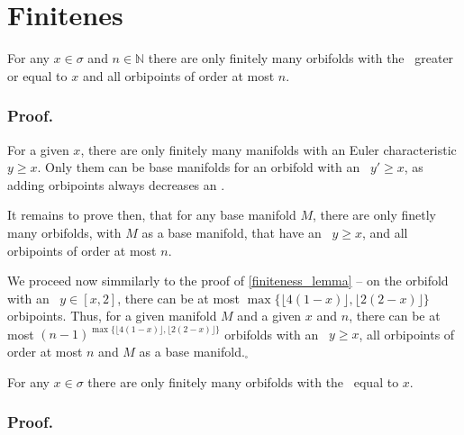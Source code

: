 \section{Finitenes}\label{finiteness}


\begin{observation}\label{first_finiteness_theorem}
For any $x \in \sigma$ and $n \in \mathbb{N}$ there are only finitely many orbifolds 
with the \Eoc\ greater or equal to $x$ and all orbipoints of order at most $n$.
\end{observation}
\subsubsection{Proof.} 

For a given $x$, there are only finitely many manifolds 
with an Euler characteristic $y \geq x$. Only them can be 
base manifolds for an orbifold with an \Eoc\ $y'\geq x$, as adding orbipoints always 
decreases an \Eoc. 

It remains to prove then, that for any base manifold $M$, there are only finetly many orbifolds, 
with $M$ as a base manifold, that have 
 an \Eoc\ $y \geq x$, and all orbipoints of order at most $n$.

We proceed now simmilarly to the proof of \ref{finiteness_lemma} -- 
on the orbifold with an \Eoc\ $y \in [x,2]$, there can be at most 
$\max \{\lfloor 4(1-x) \rfloor, \lfloor 2(2-x) \rfloor\}$ orbipoints. 
Thus, for a given manifold $M$ and a given $x$ and $n$, there can be at most 
$(n-1)^{\max \{\lfloor 4(1-x) \rfloor, \lfloor 2(2-x) \rfloor\}}$ orbifolds with an \Eoc\ 
$y \geq x$, 
all orbipoints of order at most $n$ and $M$ as a base manifold.$_\square$ 

\begin{theorem}\label{second_finiteness_theorem}
For any $x \in \sigma$ there are only finitely many orbifolds 
with the \Eoc\ equal to $x$.
\end{theorem}
\subsubsection{Proof.} 

